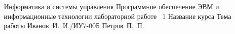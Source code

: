 
\makereporttitle
{Информатика и системы управления} %
{Программное обеспечение ЭВМ и информационные технологии} %
{лабораторной работе \textnumero~1} %
{Название курса} %
{Тема работы} %
{} %
{Иванов~И.~И./ИУ7-00Б} %
{Петров~П.~П.} %






